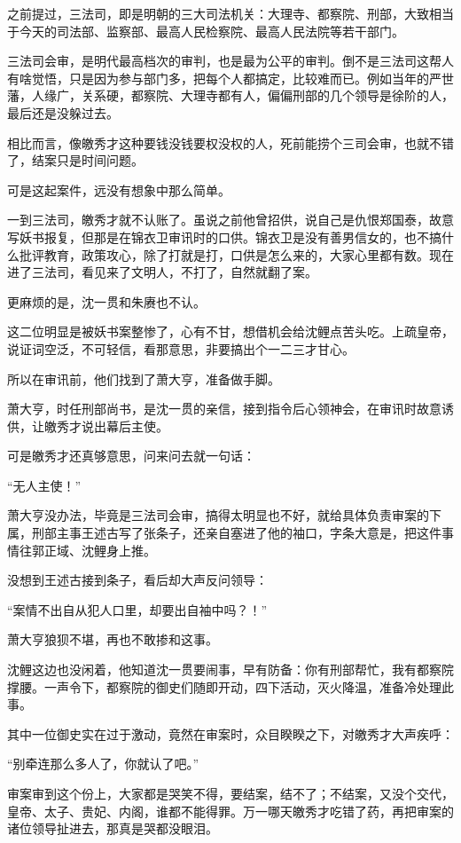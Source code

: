 \begin{multicols}{\theparacolNo}
之前提过，三法司，即是明朝的三大司法机关：大理寺、都察院、刑部，大致相当于今天的司法部、监察部、最高人民检察院、最高人民法院等若干部门。

三法司会审，是明代最高档次的审判，也是最为公平的审判。倒不是三法司这帮人有啥觉悟，只是因为参与部门多，把每个人都搞定，比较难而已。例如当年的严世藩，人缘广，关系硬，都察院、大理寺都有人，偏偏刑部的几个领导是徐阶的人，最后还是没躲过去。

相比而言，像皦秀才这种要钱没钱要权没权的人，死前能捞个三司会审，也就不错了，结案只是时间问题。

可是这起案件，远没有想象中那么简单。

一到三法司，皦秀才就不认账了。虽说之前他曾招供，说自己是仇恨郑国泰，故意写妖书报复，但那是在锦衣卫审讯时的口供。锦衣卫是没有善男信女的，也不搞什么批评教育，政策攻心，除了打就是打，口供是怎么来的，大家心里都有数。现在进了三法司，看见来了文明人，不打了，自然就翻了案。

更麻烦的是，沈一贯和朱赓也不认。

这二位明显是被妖书案整惨了，心有不甘，想借机会给沈鲤点苦头吃。上疏皇帝，说证词空泛，不可轻信，看那意思，非要搞出个一二三才甘心。

所以在审讯前，他们找到了萧大亨，准备做手脚。

萧大亨，时任刑部尚书，是沈一贯的亲信，接到指令后心领神会，在审讯时故意诱供，让皦秀才说出幕后主使。

可是皦秀才还真够意思，问来问去就一句话：

“无人主使！”

萧大亨没办法，毕竟是三法司会审，搞得太明显也不好，就给具体负责审案的下属，刑部主事王述古写了张条子，还亲自塞进了他的袖口，字条大意是，把这件事情往郭正域、沈鲤身上推。

没想到王述古接到条子，看后却大声反问领导：

“案情不出自从犯人口里，却要出自袖中吗？！”

萧大亨狼狈不堪，再也不敢掺和这事。

沈鲤这边也没闲着，他知道沈一贯要闹事，早有防备：你有刑部帮忙，我有都察院撑腰。一声令下，都察院的御史们随即开动，四下活动，灭火降温，准备冷处理此事。

其中一位御史实在过于激动，竟然在审案时，众目睽睽之下，对皦秀才大声疾呼：

“别牵连那么多人了，你就认了吧。”

审案审到这个份上，大家都是哭笑不得，要结案，结不了；不结案，又没个交代，皇帝、太子、贵妃、内阁，谁都不能得罪。万一哪天皦秀才吃错了药，再把审案的诸位领导扯进去，那真是哭都没眼泪。


\end{multicols}
